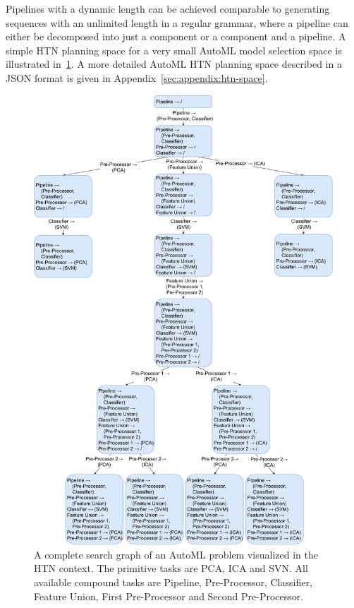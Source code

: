 Pipelines with a dynamic length can be achieved comparable to generating sequences with an unlimited length in a regular grammar, where a pipeline can either be decomposed into just a component or a component and a pipeline.
A simple HTN planning space for a very small AutoML model selection space is illustrated in~\ref{fig:appraoch:htn-automl}.
A more detailed AutoML HTN planning space described in a JSON format is given in Appendix~\ref{sec:appendix:htn-space}.
\begin{figure}[ht!]
    \centering
    \includegraphics[width=\textwidth]{gfx/Figures/Approach/HTNAutoML.pdf}
    \caption{A complete search graph of an AutoML problem visualized in the HTN context.
    The primitive tasks are PCA, ICA and SVN.
    All available compound tasks are Pipeline, Pre-Processor, Classifier, Feature Union, First Pre-Processor and Second Pre-Processor.}
    \label{fig:appraoch:htn-automl}
\end{figure}

